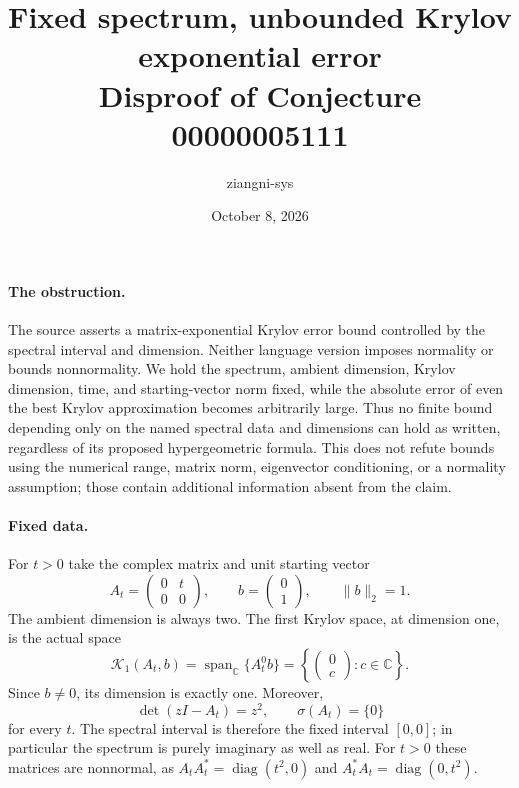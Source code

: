 \documentclass[11pt]{article}
\title{Fixed spectrum, unbounded Krylov exponential error\\Disproof of Conjecture 00000005111}
\author{ziangni-sys}
\date{October 8, 2026}
\begin{document}
\maketitle

\paragraph{The obstruction.}
The source asserts a matrix-exponential Krylov error bound controlled by
the spectral interval and dimension. Neither language version imposes
normality or bounds nonnormality. We hold the spectrum, ambient dimension,
Krylov dimension, time, and starting-vector norm fixed, while the absolute
error of even the best Krylov approximation becomes arbitrarily large.
Thus no finite bound depending only on the named spectral data and
dimensions can hold as written, regardless of its proposed hypergeometric
formula. This does not refute bounds using the numerical range, matrix norm,
eigenvector conditioning, or a normality assumption; those contain additional
information absent from the claim.

\paragraph{Fixed data.}
For $t>0$ take the complex matrix and unit starting vector
\[
 A_t=\begin{pmatrix}0&t\\0&0\end{pmatrix},\qquad
 b=\begin{pmatrix}0\\1\end{pmatrix},\qquad \|b\|_2=1.
\]
The ambient dimension is always two. The first Krylov space, at dimension
one, is the actual space
\[
 \mathcal K_1(A_t,b)=\operatorname{span}_{\mathbb C}\{A_t^0b\}
   =\left\{\begin{pmatrix}0\\c\end{pmatrix}:c\in\mathbb C\right\}.
\]
Since $b\ne0$, its dimension is exactly one. Moreover,
\[
 \det(zI-A_t)=z^2,\qquad \sigma(A_t)=\{0\}
\]
for every $t$. The spectral interval is therefore the fixed interval
$[0,0]$; in particular the spectrum is purely imaginary as well as real.
For $t>0$ these matrices are nonnormal, as
$A_tA_t^*=\operatorname{diag}(t^2,0)$ and
$A_t^*A_t=\operatorname{diag}(0,t^2)$.
\end{document}
